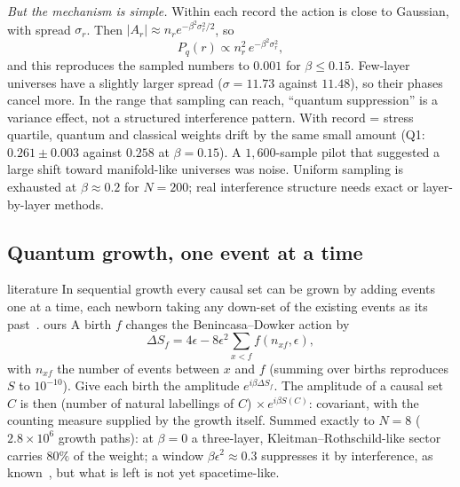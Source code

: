 \documentclass[11pt,a4paper]{article}
\newcommand{\tagbox}[2]{\textsf{\scriptsize\colorbox{#1!12}{\textcolor{#1!70!black}{#2}}}}
\newcommand{\lit}{\tagbox{blue}{literature}}
\newcommand{\ours}{\tagbox{orange}{ours}}
\begin{document}
\emph{But the mechanism is simple.} Within each record the action is close to Gaussian, with spread $\sigma_r$. Then $|A_r|\approx n_r e^{-\beta^2\sigma_r^2/2}$, so
\begin{equation}
P_q(r)\propto n_r^2\,e^{-\beta^2\sigma_r^2},
\end{equation}
and this reproduces the sampled numbers to $0.001$ for $\beta\le0.15$. Few-layer universes have a slightly larger spread ($\sigma=11.73$ against $11.48$), so their phases cancel more. In the range that sampling can reach, ``quantum suppression'' is a variance effect, not a structured interference pattern. With record = stress quartile, quantum and classical weights drift by the same small amount (Q1: $0.261\pm0.003$ against $0.258$ at $\beta=0.15$). A $1{,}600$-sample pilot that suggested a large shift toward manifold-like universes was noise. Uniform sampling is exhausted at $\beta\approx0.2$ for $N=200$; real interference structure needs exact or layer-by-layer methods.

\subsection{Quantum growth, one event at a time}
\lit{} In sequential growth every causal set can be grown by adding events one at a time, each newborn taking any down-set of the existing events as its past~\cite{RideoutSorkin00}. \ours{} A birth $f$ changes the Benincasa--Dowker action by
\begin{equation}
\Delta S_f = 4\epsilon - 8\epsilon^2\sum_{x<f} f(n_{xf},\epsilon),
\label{eq:dS}
\end{equation}
with $n_{xf}$ the number of events between $x$ and $f$ (summing over births reproduces $S$ to $10^{-10}$). Give each birth the amplitude $e^{i\beta\Delta S_f}$. The amplitude of a causal set $C$ is then (number of natural labellings of $C$)$\,\times e^{i\beta S(C)}$: covariant, with the counting measure supplied by the growth itself. Summed exactly to $N=8$ ($2.8\times10^6$ growth paths): at $\beta=0$ a three-layer, Kleitman--Rothschild-like sector carries $80\%$ of the weight; a window $\beta\epsilon^2\approx0.3$ suppresses it by interference, as known~\cite{LoomisCarlip18}, but what is left is not yet spacetime-like.
\end{document}
